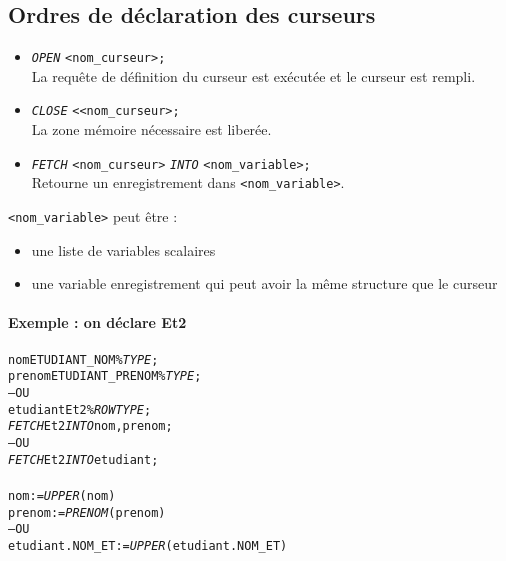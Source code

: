\documentclass[10pt]{article}
\begin{document}
        \subsection{Ordres de déclaration des curseurs}
            \begin{itemize}
                \item \emph{\texttt{OPEN}} \texttt{<nom\_curseur>;}\\
                    La requête de définition du curseur est exécutée et le curseur est rempli.
                \item \emph{\texttt{CLOSE}} \texttt{<<nom\_curseur>;}\\
                    La zone mémoire nécessaire est liberée.
                \item \emph{\texttt{FETCH}} \texttt{<nom\_curseur>} \emph{\texttt{INTO}} \texttt{<nom\_variable>;}\\
                    Retourne un enregistrement dans \texttt{<nom\_variable>}.
            \end{itemize}

            \texttt{<nom\_variable>} peut être :
            \begin{itemize}
                \item une liste de variables scalaires
                \item une variable enregistrement qui peut avoir la même structure que le curseur
            \end{itemize}

            \newpage
            \paragraph{Exemple : on déclare Et2}
                \begin{alltt}
                    \begin{tabbing}
nom ETUDIANT_NOM\%\emph{TYPE};\\
prenom ETUDIANT_PRENOM\%\emph{TYPE};\\
-- OU\\
etudiant Et2\%\emph{ROWTYPE};
\\
\emph{FETCH} Et2 \emph{INTO} nom, prenom;\\
-- OU\\
\emph{FETCH} Et2 \emph{INTO} etudiant;\\
\\
nom:=\emph{UPPER}(nom)\\
prenom:=\emph{PRENOM}(prenom)\\
-- OU\\
etudiant.NOM_ET:=\emph{UPPER}(etudiant.NOM_ET)
                    \end{tabbing}
                \end{alltt}
\end{document}
